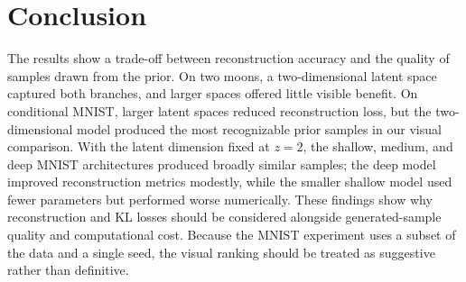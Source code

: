 \documentclass[11pt]{article}
\begin{document}
\section{Conclusion}

The results show a trade-off between reconstruction accuracy and the quality of samples drawn from the prior. On two moons, a two-dimensional latent space captured both branches, and larger spaces offered little visible benefit. On conditional MNIST, larger latent spaces reduced reconstruction loss, but the two-dimensional model produced the most recognizable prior samples in our visual comparison. With the latent dimension fixed at $z=2$, the shallow, medium, and deep MNIST architectures produced broadly similar samples; the deep model improved reconstruction metrics modestly, while the smaller shallow model used fewer parameters but performed worse numerically. These findings show why reconstruction and KL losses should be considered alongside generated-sample quality and computational cost. Because the MNIST experiment uses a subset of the data and a single seed, the visual ranking should be treated as suggestive rather than definitive.
\end{document}
